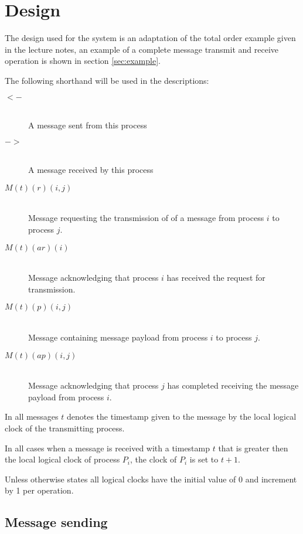 \documentclass[twocolumn]{article}
\title{\DOCTITLE}
\author{\DOCAUTHOR}
\date{\DOCDATE}
\begin{document}
\section{Design}
\label{sec:design}

The design used for the system is an adaptation of the total order example given
in the lecture notes, an example of a complete message transmit and receive
operation is shown in section \ref{sec:example}.

The following shorthand will be used in the descriptions:

\begin{description}
  \item[$<-$] \hfill \\
    A message sent from this process
  \item[$->$] \hfill \\
    A message received by this process
  \item[$M(t)(r)(i,j)$] \hfill \\
    Message requesting the transmission of of a message from process $i$ to
    process $j$.
  \item[$M(t)(ar)(i)$] \hfill \\
    Message acknowledging that process $i$ has received the request for
    transmission.
  \item[$M(t)(p)(i,j)$] \hfill \\
    Message containing message payload from process $i$ to process $j$.
  \item[$M(t)(ap)(i,j)$] \hfill \\
    Message acknowledging that process $j$ has completed receiving the message
    payload from process $i$.
\end{description}

In all messages $t$ denotes the timestamp given to the message by the local
logical clock of the transmitting process.

In all cases when a message is received with a timestamp $t$ that is greater
then the local logical clock of process $P_{i}$, the clock of $P_{i}$ is set to
$t + 1$.

Unless otherwise states all logical clocks have the initial value of 0 and
increment by 1 per operation.

\subsection{Message sending}
\label{sec:sending}
\end{document}
